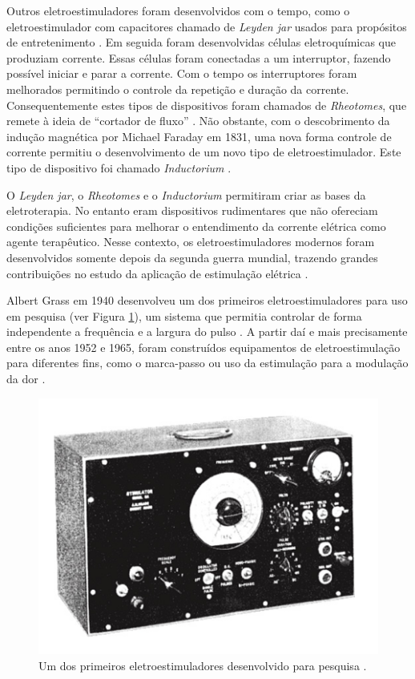 Outros eletroestimuladores foram desenvolvidos com o tempo, como o eletroestimulador com capacitores chamado de \textit{Leyden jar} usados para propósitos de entretenimento \cite{Geddes1994}. Em seguida foram desenvolvidas células eletroquímicas que produziam corrente. Essas células foram conectadas a um interruptor, fazendo possível iniciar e parar a corrente. Com o tempo os interruptores foram melhorados permitindo o controle da repetição e duração da corrente. Consequentemente estes tipos de dispositivos foram chamados de \textit{Rheotomes}, que remete à ideia de “cortador de fluxo” \cite{Geddes1994}. Não obstante, com o descobrimento da indução magnética por Michael Faraday em 1831, uma nova forma controle de corrente permitiu o desenvolvimento de um novo tipo de eletroestimulador. Este tipo de dispositivo foi chamado \textit{Inductorium} \cite{Geddes1994}.

O \textit{Leyden jar}, o \textit{Rheotomes} e o \textit{Inductorium} permitiram criar as bases da eletroterapia. No entanto eram dispositivos rudimentares que não ofereciam condições suficientes para melhorar o entendimento da corrente elétrica como agente terapêutico. Nesse contexto, os eletroestimuladores modernos foram desenvolvidos somente depois da segunda guerra mundial, trazendo grandes contribuições no estudo da aplicação de estimulação elétrica \cite{Faria2006}. 

Albert Grass em 1940 desenvolveu um dos primeiros eletroestimuladores para uso em pesquisa (ver Figura \ref{fig:pes_f2}), um sistema que permitia controlar de forma independente a frequência e a largura do pulso \cite{Geddes1994}. A partir daí e mais precisamente entre os anos 1952 e 1965, foram construídos equipamentos de eletroestimulação para diferentes fins, como o marca-passo ou uso da estimulação para a modulação da dor \cite{Faria2006}.  

\begin{figure}
    \centering %
    \includegraphics[width=0.4\linewidth]{figs/Fig_c3/pes_f2}
    \caption{Um dos primeiros eletroestimuladores desenvolvido para pesquisa \cite{Geddes1994}.}
    \label{fig:pes_f2}
\end{figure}


